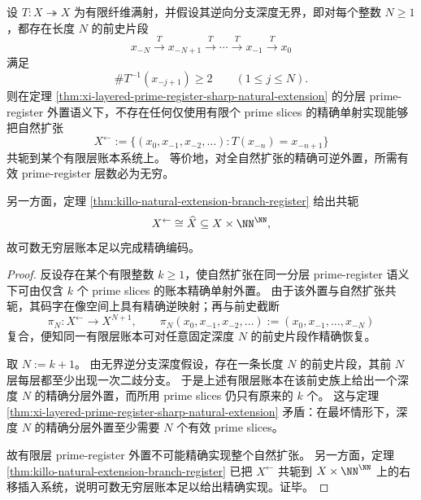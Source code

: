 \begin{theorem}\label{thm:xi-natural-extension-infinite-prime-register-necessity}
设 \(T:X\twoheadrightarrow X\) 为有限纤维满射，并假设其逆向分支深度无界，即对每个整数 \(N\ge 1\)，都存在长度 \(N\) 的前史片段
\[
x_{-N}\xrightarrow{\,T\,}x_{-N+1}\xrightarrow{\,T\,}\cdots\xrightarrow{\,T\,}x_{-1}\xrightarrow{\,T\,}x_0
\]
满足
\[
\#T^{-1}(x_{-j+1})\ge 2
\qquad(1\le j\le N).
\]
则在定理 \ref{thm:xi-layered-prime-register-sharp-natural-extension} 的分层 prime-register 外置语义下，不存在任何仅使用有限个 prime slices 的精确单射实现能够把自然扩张
\[
X^{\leftarrow}
:=
\{(x_0,x_{-1},x_{-2},\dots):T(x_{-n})=x_{-n+1}\}
\]
共轭到某个有限层账本系统上。
等价地，对全自然扩张的精确可逆外置，所需有效 prime-register 层数必为无穷。

另一方面，定理 \ref{thm:killo-natural-extension-branch-register} 给出共轭
\[
X^{\leftarrow}\cong \widehat X\subseteq X\times\NN^\NN,
\]
故可数无穷层账本足以完成精确编码。
\end{theorem}
\begin{proof}
反设存在某个有限整数 \(k\ge 1\)，使自然扩张在同一分层 prime-register 语义下可由仅含 \(k\) 个 prime slices 的账本精确单射外置。
由于该外置与自然扩张共轭，其码字在像空间上具有精确逆映射；再与前史截断
\[
\pi_N:X^{\leftarrow}\to X^{N+1},
\qquad
\pi_N(x_0,x_{-1},x_{-2},\dots):=(x_0,x_{-1},\dots,x_{-N})
\]
复合，便知同一有限层账本可对任意固定深度 \(N\) 的前史片段作精确恢复。

取 \(N:=k+1\)。
由无界逆分支深度假设，存在一条长度 \(N\) 的前史片段，其前 \(N\) 层每层都至少出现一次二歧分支。
于是上述有限层账本在该前史族上给出一个深度 \(N\) 的精确分层外置，而所用 prime slices 仍只有原来的 \(k\) 个。
这与定理 \ref{thm:xi-layered-prime-register-sharp-natural-extension} 矛盾：在最坏情形下，深度 \(N\) 的精确分层外置至少需要 \(N\) 个有效 prime slices。

故有限层 prime-register 外置不可能精确实现整个自然扩张。
另一方面，定理 \ref{thm:killo-natural-extension-branch-register} 已把 \(X^{\leftarrow}\) 共轭到 \(X\times\NN^\NN\) 上的右移插入系统，说明可数无穷层账本足以给出精确实现。证毕。
\end{proof}

